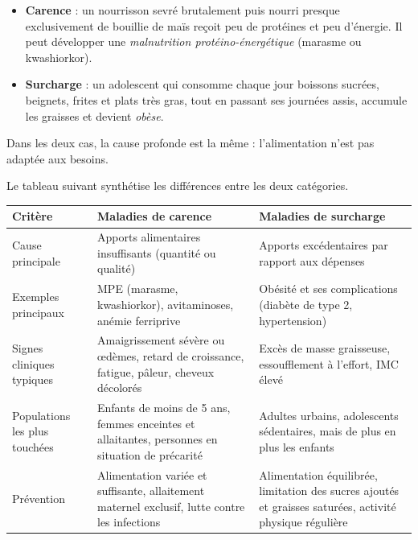 \documentclass[11pt]{article}
\begin{document}
\begin{exemplebox}
\begin{itemize}
  \item \textbf{Carence} : un nourrisson sevré brutalement puis nourri presque exclusivement de bouillie de maïs reçoit peu de protéines et peu d'énergie. Il peut développer une \emph{malnutrition protéino-énergétique} (marasme ou kwashiorkor).
  \item \textbf{Surcharge} : un adolescent qui consomme chaque jour boissons sucrées, beignets, frites et plats très gras, tout en passant ses journées assis, accumule les graisses et devient \emph{obèse}.
\end{itemize}
Dans les deux cas, la cause profonde est la même : l'alimentation n'est pas adaptée aux besoins.
\end{exemplebox}

Le tableau suivant synthétise les différences entre les deux catégories.

\begin{center}
\begin{tabularx}{\linewidth}{|l|X|X|}
\hline
\rowcolor{popblueL} \textbf{Critère} & \textbf{Maladies de carence} & \textbf{Maladies de surcharge} \\
\hline
Cause principale & Apports alimentaires insuffisants (quantité ou qualité) & Apports excédentaires par rapport aux dépenses \\
\hline
Exemples principaux & MPE (marasme, kwashiorkor), avitaminoses, anémie ferriprive & Obésité et ses complications (diabète de type 2, hypertension) \\
\hline
Signes cliniques typiques & Amaigrissement sévère ou œdèmes, retard de croissance, fatigue, pâleur, cheveux décolorés & Excès de masse graisseuse, essoufflement à l'effort, IMC élevé \\
\hline
Populations les plus touchées & Enfants de moins de 5 ans, femmes enceintes et allaitantes, personnes en situation de précarité & Adultes urbains, adolescents sédentaires, mais de plus en plus les enfants \\
\hline
Prévention & Alimentation variée et suffisante, allaitement maternel exclusif, lutte contre les infections & Alimentation équilibrée, limitation des sucres ajoutés et graisses saturées, activité physique régulière \\
\hline
\end{tabularx}
\end{center}
\end{document}

